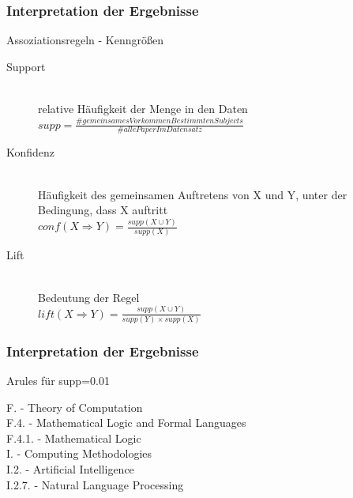 \documentclass[12pt, xcolor=table]{beamer}
\renewcommand{\footnotesize}{\tiny}
\begin{document}
\begin{frame}
	\frametitle{Interpretation der Ergebnisse}
    \begin{block}{Assoziationsregeln - Kenngrößen}
    \begin{center}
        \begin{description}
			\item [Support  ] \hfill \\
                relative Häufigkeit der Menge in den Daten\\
                $supp = \frac{\# gemeinsames Vorkommen Bestimmten Subjects}{\# alle Paper Im Datensatz}$\\
			\item [Konfidenz ] \hfill \\
                Häufigkeit des gemeinsamen Auftretens von X und Y, unter der Bedingung, dass X auftritt\\
                $conf(X\Rightarrow Y) = \frac{supp(X\cup Y)}{supp(X)} $\\

			\item [Lift ] \hfill \\
                Bedeutung der Regel\\
                $lift(X\Rightarrow Y) = \frac{supp(X\cup Y)}{supp(Y)\times supp(X)} $\\
	    \end{description}
    \end{center}
    \end{block}
\end{frame}
\begin{frame}[fragile]
    \frametitle{Interpretation der Ergebnisse}
    \begin{block}{Arules für supp=0.01}
    	
	\end{block}
    {\footnotesize
        F. - Theory of Computation\\
        F.4. - Mathematical Logic and Formal Languages\\
        F.4.1. - Mathematical Logic\\
        I. - Computing Methodologies\\
        I.2. - Artificial Intelligence\\
        I.2.7. - Natural Language Processing\\
    }
\end{frame}
\end{document}
